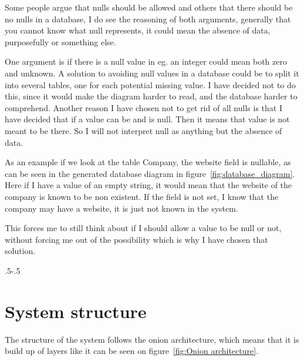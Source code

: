 Some people argue that nulls should be allowed and others that there should be
no nulls in a database\cite{stackexchange:db:nullfields}, I do see the reasoning
of both arguments, generally that you cannot know what null represents, it could
mean the absence of data, purposefully or something else. 

One argument is if there is a null value in eg. an integer could mean both zero
and unknown. A solution to avoiding null values in a database could be to split
it into several tables, one for each potential missing value. I have decided not
to do this, since it would make the diagram harder to read, and the database
harder to comprehend. Another reason I have chosen not to get rid of all nulls
is that I have decided that if a value can be and is null. Then it means that
value is not meant to be there. So I will not interpret null as anything but the
absence of data.

As an example if we look at the table Company, the website field is nullable, as
can be seen in the generated database diagram in figure~\ref{fig:database_diagram}.
Here if I have a value of an empty string, it would mean that the website of
the company is known to be non existent. If the field is not set, I know that
the company may have a website, it is just not known in the system.

This forces me to still think about if I should allow a value to be null or not,
without forcing me out of the possibility which is why I have chosen that
solution. 

\clearpage
{\pdfpagewidth
    \vspace*{-2cm}
    \noindent\kern.5\pdfpagewidth{}\kern-.5\pdfpagewidth 
     \par
     \vspace*{-5cm}
\clearpage
}
\section{System structure}
\label{sec:System structure}
The structure of the system follows the onion
architecture\cite{onion_architecture}, which means that it is build up of layers
like it can be seen on figure~\ref{fig:Onion architecture}. 

